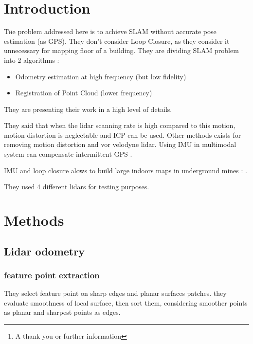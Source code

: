 \documentclass[twoside,twocolumn]{article}
\title{\citetitle{zhang_low-drift_2017}} %
\author{%
\textsc{Virgile Daugé}\thanks{A thank you or further information} \\[1ex] %
\normalsize University of Lorraine \\ %
\normalsize \href{mailto:virgile.dauge@inria.fr}{virgile.dauge@inria.fr} %
}
\date{\today} %
\begin{document}
\maketitle


\section{Introduction}
\lettrine[nindent=0em,lines=3]{T}he problem addressed here is to achieve SLAM without accurate pose estimation (as GPS).
They don't consider Loop Closure, as they consider it unnecessary for mapping floor of a building.
They are dividing SLAM problem into 2 algorithms :
\begin{itemize}
  \item Odometry estimation at high frequency (but low fidelity)
  \item Registration of Point Cloud (lower frequency)
\end{itemize}

They are presenting their work in a high level of details.

They said that when the lidar scanning rate is high compared to this motion, motion distortion is neglectable and ICP \cite{pomerleau_comparing_2013} can be used.
Other methods exists for removing motion distortion \cite{hong_vicp:_2010} and \cite{moosmann_velodyne_2011} vor velodyne lidar.
Using IMU in multimodal system can compensate intermittent GPS \cite{scherer_river_2012}.

IMU and loop closure alows to build large indoors maps in underground mines : \cite{yoshida_efficient_2014}.

They used 4 different lidars for testing purposes.


\section{Methods}
\subsection{Lidar odometry}
\subsubsection{feature point extraction}
They select feature point on sharp edges and planar surfaces patches.
they evaluate smoothness of local surface, then sort them, considering smoother points as planar and sharpest points as edges.
\end{document}
